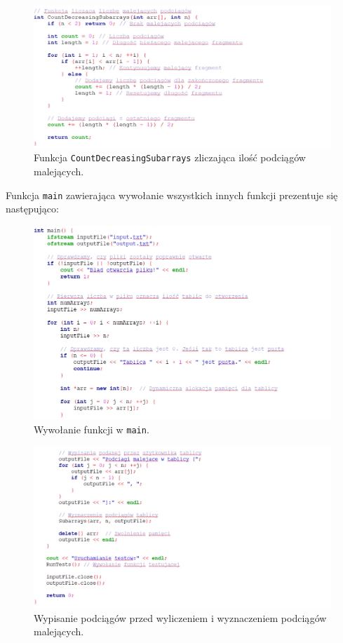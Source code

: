 \documentclass[a4paper,12pt]{article}
\begin{document}
\begin{figure}[H]
    \centering
    \includegraphics[width=1\textwidth]{Count1.png}
    \caption{Funkcja \texttt{CountDecreasingSubarrays} zliczająca ilość podciągów malejących.}
    \label{fig:Count1}
\end{figure}

\newpage

Funkcja \texttt{main} zawierająca wywołanie wszystkich innych funkcji prezentuje się następująco:

\begin{figure}[H]
    \centering
    \includegraphics[width=1\textwidth]{Implement5.png}
    \caption{Wywołanie funkcji w \texttt{main}.}
    \label{fig:Implement5}
\end{figure}

\begin{figure}[H]
    \centering
    \includegraphics[width=1\textwidth]{Implement6.png}
    \caption{Wypisanie podciągów przed wyliczeniem i wyznaczeniem podciągów malejących.}
    \label{fig:Implement6}
\end{figure}
\end{document}
